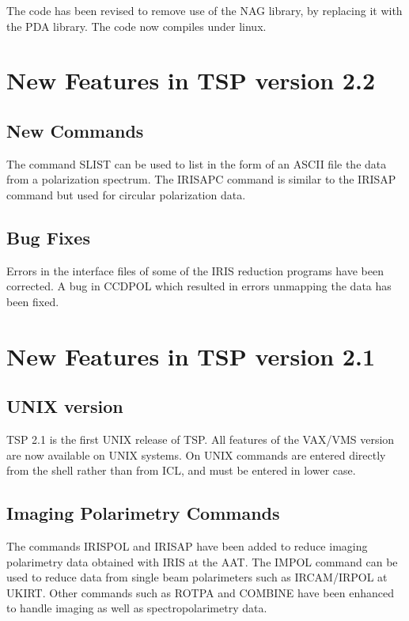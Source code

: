 The code has been revised to remove use of the NAG library, by replacing it
with the PDA library. The code now compiles under linux.

\section{New Features in TSP version 2.2}

\subsection{New Commands}

The command SLIST can be used to list in the form of an ASCII file the data from a 
polarization spectrum. The IRISAPC command is similar to the IRISAP command but used for circular
polarization data.

\subsection{Bug Fixes}

Errors in the interface files of some of the IRIS reduction programs have been corrected. A
bug in CCDPOL which resulted in errors unmapping the data has been fixed.



\section{New Features in TSP version 2.1}

\subsection{UNIX version}

TSP 2.1 is the first UNIX release of TSP. All features of the VAX/VMS version are now available on UNIX systems. On UNIX commands are entered directly from the shell rather than from ICL, and must be entered in lower case.

\subsection{Imaging Polarimetry Commands}

The commands IRISPOL and IRISAP have been added to reduce imaging polarimetry data obtained with IRIS at the AAT. The IMPOL command can be used to reduce data from single beam polarimeters such as IRCAM/IRPOL at UKIRT. Other commands such as ROTPA and COMBINE have been enhanced to handle imaging as well as spectropolarimetry data.

